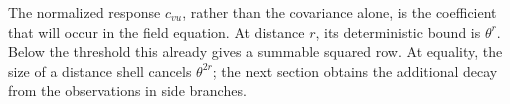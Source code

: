 The normalized response \(c_{vu}\), rather than the covariance alone,
is the coefficient that will occur in the field equation.  At distance
\(r\), its deterministic bound is \(\theta^r\).  Below the threshold
this already gives a summable squared row.  At equality, the size of a
distance shell cancels \(\theta^{2r}\); the next section obtains the
additional decay from the observations in side branches.
